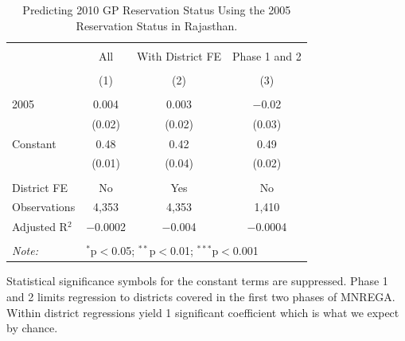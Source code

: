 \begin{table}[!htbp]
\centering
\begin{threeparttable}

  \caption{Predicting 2010 GP Reservation Status Using the 2005 Reservation Status in Rajasthan.} 
  \label{rand_or_no_raj} 
\scriptsize 
\begin{tabular}{@{\extracolsep{0pt}}lccc} 
\\[-1.8ex]\hline 
\hline \\[-1.8ex] 
 & All & With District FE & Phase 1 and 2 \\ 
\\[-1.8ex] & (1) & (2) & (3)\\ 
\hline \\[-1.8ex] 
 2005 & 0.004 & 0.003 & $-$0.02 \\ 
  & (0.02) & (0.02) & (0.03) \\ 
  Constant & 0.48 & 0.42 & 0.49 \\ 
  & (0.01) & (0.04) & (0.02) \\ 
 \hline \\[-1.8ex] 
District FE & No & Yes & No \\ 
Observations & 4,353 & 4,353 & 1,410 \\ 
Adjusted R$^{2}$ & $-$0.0002 & $-$0.004 & $-$0.0004 \\ 
\hline 
\hline \\[-1.8ex] 
\textit{Note:}  & \multicolumn{3}{l}{$^{*}$p$<$0.05; $^{**}$p$<$0.01; $^{***}$p$<$0.001} \\ 
\end{tabular} 
\begin{tablenotes}[flushleft]
\scriptsize
\item[] Statistical significance symbols for the constant terms are suppressed.
                     Phase 1 and 2 limits regression to districts covered in the first two phases of MNREGA.
                     Within district regressions yield 1 significant coefficient which is what we expect by chance.
\end{tablenotes}
\end{threeparttable}
\end{table}
